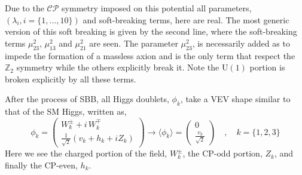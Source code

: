 %
%
Due to the $\mathcal{CP}$ symmetry imposed on this potential all parameters, $(\lambda_i,i=\{1,...,10\})$ and soft-breaking terms, here are real.
%
The most generic version of this soft breaking is given by the second line, where the soft-breaking terms $\mu_{23}^2$, $\mu_{13}^2$ and $\mu_{21}^2$ are seen. 
%
The parameter $\mu_{23}^2$, is necessarily added as to impede the formation of a massless axion and is the only term that respect the $\mathbb{Z}_2$ symmetry while the others explicitly break it. Note the  $\mathrm{U(1)}$ portion is broken explicitly by all these terms. 
%
%
%

After the process of SBB, all Higgs doublets, $\phi_k$, take a VEV shape similar to that of the SM Higgs, written as, 
%
\begin{equation}
\phi_k = 
\begin{pmatrix}
W_k^\pm + i \, W_k^\mp \\ 
\frac{1}{\sqrt{2}}\left( v_k + h_k + i Z_k \right)
\end{pmatrix}  \rightarrow \langle \phi_k \rangle = \begin{pmatrix}
0 \\ 
\frac{v_k}{\sqrt{2}}
\end{pmatrix} \quad , \quad k=\{ 1,2,3\} 
\label{eq:3HDM_Higgs_Field_VEV}
\end{equation} 
%
Here we see the charged portion of the field, $W_k^\pm$, the CP-odd portion, $Z_k$, and finally the CP-even, $h_k$. 
%
%

